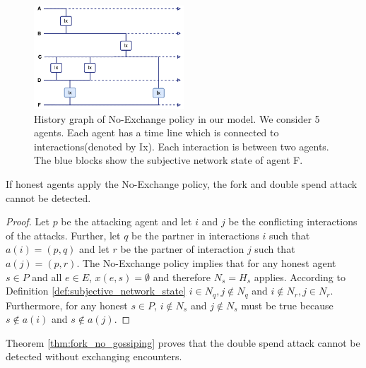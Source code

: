 \begin{figure}
    \centering
    \includegraphics[width=0.5\textwidth]{images/no_exchange_policy.pdf}
    \caption{History graph of No-Exchange policy in our model. We consider 5 agents. Each agent has a time
    line which is connected to interactions(denoted by Ix). Each interaction is between two agents. The blue blocks show the subjective network state of agent F.}
    \label{fig:no_exchange_policy}
\end{figure}

\begin{thm}
    \label{thm:fork_no_gossiping}
    If honest agents apply the No-Exchange policy, the fork and double spend attack cannot be detected.
\end{thm}
\begin{proof}
    Let $p$ be the attacking agent and let $i$ and $j$ be the conflicting interactions of the 
    attacks. Further, let $q$ be the partner in interactions $i$ such that $a(i) = (p, q)$ and let 
    $r$ be the partner of interaction $j$ such that $a(j) = (p, r)$. 
    The No-Exchange policy implies that for any honest agent $s \in P$ and all $e \in E$, $x(e, s) = \emptyset$ 
    and therefore $N_s = H_s$ applies. 
    According to Definition \ref{def:subjective_network_state} $i \in N_{q}, j \notin N_{q}$ and 
    $i \notin N_{r}, j \in N_{r}$. 
    Furthermore, for any honest $s \in P$, $i \notin N_s$ and $j \notin N_s$ must be true because
    $s \notin a(i)$ and $s \notin a(j)$.
\end{proof}

Theorem \ref{thm:fork_no_gossiping} proves that the double spend attack cannot be
detected without exchanging encounters. 

